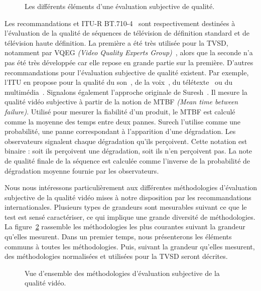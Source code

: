 \begin{figure}[htbp]
  \centering
  \begin{tikzpicture}[text width=5cm]\end{tikzpicture}
  \caption{Les différents éléments d'une évaluation subjective de qualité.}
  \label{fig:QuiOuComment}
\end{figure}

Les recommandations \ituCC{} et ITU-R BT.710-4~\cite{itu-bt710-4} sont respectivement destinées à l'évaluation de la qualité de séquences de télévision de définition standard et de télévision haute définition. La première a été très utilisée pour la TVSD, notamment par VQEG \emph{(Video Quality Experts Group)}~\cite{vqeg-frtv2}, alors que la seconde n'a pas été très développée car elle repose en grande partie sur la première. D'autres recommandations pour l'évaluation subjective de qualité existent. Par exemple, l'ITU en propose pour la qualité du son~\cite{itu-bs1284-1}, de la voix~\cite{itu-p85}, du télétexte~\cite{itu-bt812} ou du multimédia~\cite{itu-p910,itu-bt1788}. Signalons également l'approche originale de Suresh~\cite{suresh-icassp2006}. Il mesure la qualité vidéo subjective à partir de la notion de MTBF \emph{(Mean time between failure)}. Utilisé pour mesurer la fiabilité d'un produit, le MTBF est calculé comme la moyenne des temps entre deux pannes. Surech l'utilise comme une probabilité, une panne correspondant à l'apparition d'une dégradation. Les observateurs signalent chaque dégradation qu'ils perçoivent. Cette notation est binaire : soit ils perçoivent une dégradation, soit ils n'en perçoivent pas. La note de qualité finale de la séquence est calculée comme l'inverse de la probabilité de dégradation moyenne fournie par les observateurs.

Nous nous intéressons particulièrement aux différentes méthodologies d'évaluation subjective de la qualité vidéo mises à notre disposition par les recommandations internationales. Plusieurs types de grandeurs sont mesurables suivant ce que le test est sensé caractériser, ce qui implique une grande diversité de méthodologies. La figure~\ref{fig:methodoSubj} rassemble les méthodologies les plus courantes suivant la grandeur qu'elles mesurent. Dans un premier temps, nous présenterons les éléments communs à toutes les méthodologies. Puis, suivant la grandeur qu'elles mesurent, des méthodologies normalisées et utilisées pour la TVSD seront décrites.

\begin{figure}[htbp]
  \centering
  \begin{tikzpicture}[text centered,text width=2cm,scale=1.05]\end{tikzpicture}
  \caption{Vue d'ensemble des méthodologies d'évaluation subjective de la qualité vidéo.}
  \label{fig:methodoSubj}
\end{figure}


